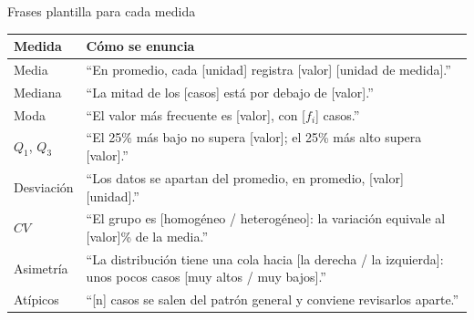 \documentclass[aspectratio=169,10pt]{beamer}
\begin{document}
\begin{frame}{Frases plantilla para cada medida}
  \scriptsize
  \begin{center}
  \begin{tabular}{@{}p{2.4cm}p{9.4cm}@{}}
    \toprule
    \textbf{Medida} & \textbf{Cómo se enuncia} \\
    \midrule
    Media & ``En promedio, cada [unidad] registra [valor] [unidad de medida].'' \\
    Mediana & ``La mitad de los [casos] está por debajo de [valor].'' \\
    Moda & ``El valor más frecuente es [valor], con [$f_i$] casos.'' \\
    $Q_1$, $Q_3$ & ``El 25\% más bajo no supera [valor]; el 25\% más alto
      supera [valor].'' \\
    Desviación & ``Los datos se apartan del promedio, en promedio,
      [valor] [unidad].'' \\
    $CV$ & ``El grupo es [homogéneo / heterogéneo]: la variación equivale al
      [valor]\% de la media.'' \\
    Asimetría & ``La distribución tiene una cola hacia [la derecha / la
      izquierda]: unos pocos casos [muy altos / muy bajos].'' \\
    Atípicos & ``[n] casos se salen del patrón general y conviene revisarlos
      aparte.'' \\
    \bottomrule
  \end{tabular}
  \end{center}
\end{frame}
\end{document}
